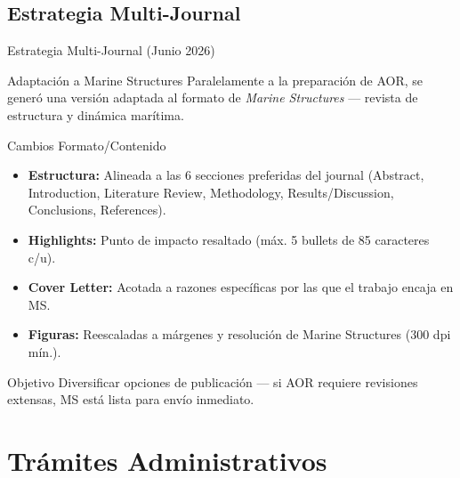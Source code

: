 \documentclass{beamer}
\begin{document}
\subsection{Estrategia Multi-Journal}

\begin{frame}{Estrategia Multi-Journal (Junio 2026)}
    \small
    \begin{block}{Adaptación a Marine Structures}
        Paralelamente a la preparación de AOR, se generó una versión adaptada al formato de \textit{Marine Structures} — revista de estructura y dinámica marítima.
    \end{block}

    \vspace{0.3cm}

    \begin{block}{Cambios Formato/Contenido}
        \begin{itemize}
            \item \textbf{Estructura:} Alineada a las 6 secciones preferidas del journal (Abstract, Introduction, Literature Review, Methodology, Results/Discussion, Conclusions, References).
            \item \textbf{Highlights:} Punto de impacto resaltado (máx. 5 bullets de 85 caracteres c/u).
            \item \textbf{Cover Letter:} Acotada a razones específicas por las que el trabajo encaja en MS.
            \item \textbf{Figuras:} Reescaladas a márgenes y resolución de Marine Structures (300 dpi mín.).
        \end{itemize}
    \end{block}

    \vspace{0.3cm}

    \begin{block}{Objetivo}
        Diversificar opciones de publicación — si AOR requiere revisiones extensas, MS está lista para envío inmediato.
    \end{block}
\end{frame}

\section[Trámites]{Trámites Administrativos}
\end{document}
